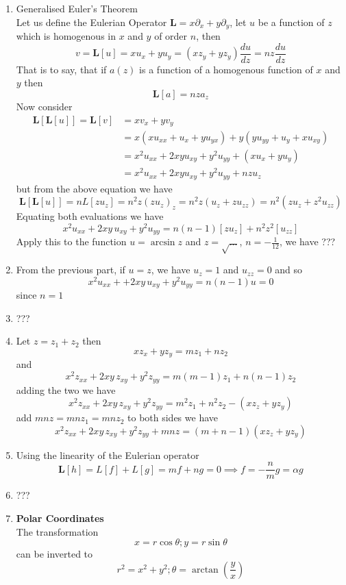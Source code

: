 \documentclass[12pt]{article}
\begin{document}
\begin{enumerate}
\item Generalised Euler's Theorem \\
Let us define the Eulerian Operator $\mathbf{L} = x\partial_{x} + y\partial_{y}$, let $u$ be a function of $z$ which is homogenous in $x$ and $y$ of order $n$, then
$$
v = \mathbf{L}[u] = xu_{x} + yu_{y} = (xz_{y} + yz_{y}) \frac{du}{dz} = n z \frac{du}{dz} 
$$
That is to say, that if $a(z)$ is a function of a homogenous function of $x$ and $y$ then
$$
\boxed{
\mathbf{L}[a] = nza_{z}
}
$$
Now consider 
$$
\begin{aligned}
\mathbf{L}[\mathbf{L}[u]] = 
\mathbf{L} [v] &= xv_{x} + yv_{y} \\
&= x(xu_{xx} + u_{x} + yu_{yx}) + y(yu_{yy} + u_{y}+xu_{xy})  \\
&=x^{2}u_{x x} + 2xy u_{xy} + y^{2} u_{yy} + (xu_{x}+ yu_{y}) \\
&=x^{2}u_{x x} + 2xy u_{xy} + y^{2} u_{yy} + nzu_{z}
\end{aligned}
$$
but from the above equation we have
$$
\mathbf{L}[\mathbf{L}[u]] = nL[z u_{z}] = n^{2}z(zu_{z})_{z} = n^{2}z(u_{z} + zu_{zz}) = n^{2}(zu_{z } + z^{2}u_{zz})
$$
Equating both evaluations we have
$$
x^{2}u_{xx} + 2xy\, u_{xy} + y^{2} u_{yy} = n(n-1)\left[ zu_{z} \right] + n^{2}z^{2} \left[ u_{zz} \right]
$$
Apply this to the function $u = \arcsin z$ and $z = \sqrt{ \dots }$, $n = -\frac{1}{12}$, we have
???
\item From the previous part, if $u =  z$, we have $u_{z}=1$ and $u_{zz}=0$ and so
$$
x^{2}u_{x x} + + 2xy \, u_{xy} + y^{2} u_{yy} = n(n-1)u = 0
$$
since $n=1$
\item ???
\item Let $z = z_{1} + z_{2}$
then
$$
xz_{x} + yz_{y} = mz_{1} + nz_{2}
$$
and
$$
x^{2} z_{xx} + 2xy \, z_{xy} + y^{2} z_{yy} = m(m-1)z_{1} + n(n-1)z_{2}
$$
adding the two we have
$$
x^{2} z_{xx} + 2xy \, z_{xy} + y^{2} z_{yy} = m^{2}z_{1} + n^{2}z_{2} - (xz_{z}+yz_{y})
$$
add $mnz = mnz_{1} = mnz_{2}$ to both sides we have
$$
x^{2} z_{xx} + 2xy \, z_{xy} + y^{2} z_{yy}  + mnz= (m + n-1) (xz_{z}+yz_{y})
$$
\item Using the linearity of the Eulerian operator
$$
\mathbf{L}[h] = L[f] + L[g] = mf + ng = 0 \implies f = -\frac{n}{m}g = \alpha g
$$
\item ???
\item \textbf{Polar Coordinates} \\
The transformation
$$
x = r\cos \theta; y = r \sin \theta
$$
can be inverted to
$$
r^{2} = x^{2} + y^{2}; \theta = \arctan\left( \frac{y}{x} \right)
$$
\end{enumerate}
\end{document}
